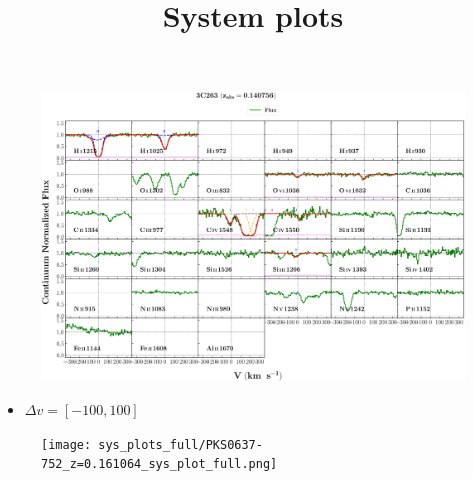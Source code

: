 \documentclass[12pt]{report}
\title{\textbf{System plots}}
\begin{document}
\maketitle




\begin{landscape}

    \begin{figure}
    \centering
    \vspace{-20mm}
    \hspace*{-35mm}
    \includegraphics[width=1.25\linewidth]{sys_plots_full/3C263_z=0.140756_sys_plot_full.png}
    \end{figure}
    
\end{landscape}

\begin{itemize}
    \item $\Delta v = [-100,100]$
\end{itemize}



\begin{landscape}

    \begin{figure}
    \centering
    \vspace{-20mm}
    \hspace*{-35mm}
    \texttt{[image: sys\_plots\_full/PKS0637-752\_z=0.161064\_sys\_plot\_full.png]}
    \end{figure}
    
\end{landscape}
\end{document}
